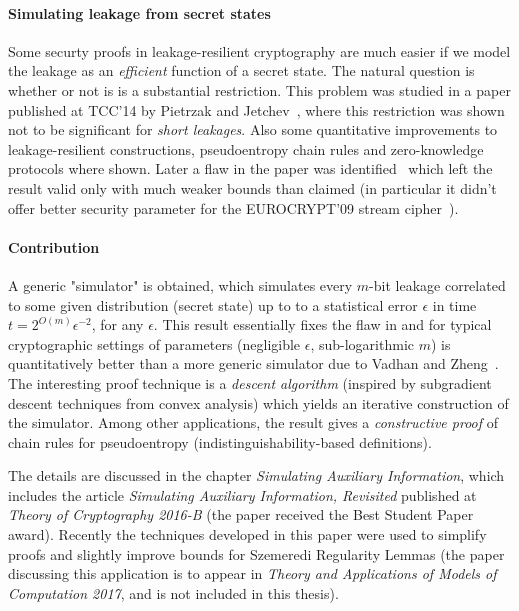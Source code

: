 \documentclass[12pt]{report}
\begin{document}
\paragraph{Simulating leakage from secret states}
Some securty proofs in leakage-resilient cryptography are much easier if we model the leakage as an \emph{efficient} function of a secret state. The natural question is whether or not is is a substantial restriction. This problem was studied in a paper published at TCC'14 
by Pietrzak and Jetchev~\cite{DBLP:conf/tcc/JetchevP14}, where this restriction was shown not to be significant for \emph{short leakages}. Also some quantitative improvements to leakage-resilient constructions, pseudoentropy chain rules and zero-knowledge protocols where shown. Later a flaw in the paper was identified~\cite{DBLP:conf/provsec/Skorski15} which left the result valid only with much weaker bounds than claimed (in particular 
it didn't offer better security parameter for the EUROCRYPT'09 stream cipher~\cite{DBLP:conf/eurocrypt/Pietrzak09}).

\paragraph{Contribution}
A generic "simulator" is obtained, which simulates every $m$-bit leakage correlated to some given distribution (secret state) up  to to a statistical error $\epsilon$
in time $t = 2^{O(m)}\epsilon^{-2}$, for any $\epsilon$. This result essentially fixes the flaw in \cite{DBLP:conf/tcc/JetchevP14} and for typical cryptographic settings of parameters (negligible $\epsilon$, sub-logarithmic $m$)  is quantitatively better than a more generic simulator due to Vadhan and Zheng~\cite{DBLP:conf/crypto/VadhanZ13}. 
The interesting proof technique is a \emph{descent algorithm} (inspired by subgradient descent techniques from convex analysis) which yields an iterative construction of the simulator. Among other applications, the result
gives a \emph{constructive proof} of chain rules for pseudoentropy (indistinguishability-based definitions).

The details are discussed in the chapter \emph{Simulating Auxiliary Information}, which includes the article 
\emph{Simulating Auxiliary Information, Revisited} published at \emph{Theory of Cryptography 2016-B} (the paper received the Best Student Paper award). Recently the techniques developed in this paper were used to simplify proofs and slightly improve bounds
for Szemeredi Regularity Lemmas (the paper discussing this application is to appear in 
\emph{Theory and Applications of Models of Computation 2017}, and is not included in this thesis).
\end{document}

